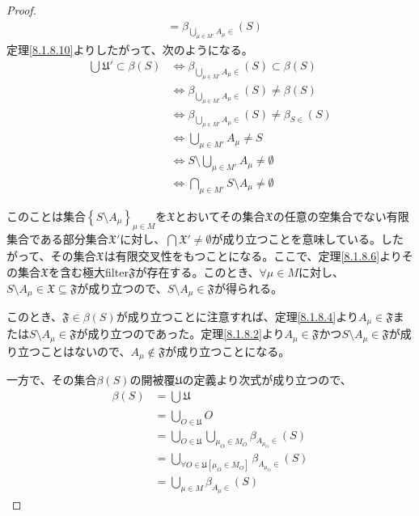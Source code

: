 \documentclass[dvipdfmx]{jsarticle}
\begin{document}
\begin{proof}
\begin{align*}
&= \beta_{\bigcup_{\mu \in M'} A_{\mu} \in}(S)
\end{align*}
定理\ref{8.1.8.10}よりしたがって、次のようになる。
\begin{align*}
\bigcup_{} \mathfrak{U}' \subset \beta(S) &\Leftrightarrow \beta_{\bigcup_{\mu \in M'} A_{\mu} \in}(S) \subset \beta(S)\\
&\Leftrightarrow \beta_{\bigcup_{\mu \in M'} A_{\mu} \in}(S) \neq \beta(S)\\
&\Leftrightarrow \beta_{\bigcup_{\mu \in M'} A_{\mu} \in}(S) \neq \beta_{S \in}(S)\\
&\Leftrightarrow \bigcup_{\mu \in M'} A_{\mu} \neq S\\
&\Leftrightarrow S \setminus \bigcup_{\mu \in M'} A_{\mu} \neq \emptyset\\
&\Leftrightarrow \bigcap_{\mu \in M'} {S \setminus A_{\mu}} \neq \emptyset
\end{align*}\par
このことは集合$\left\{ S \setminus A_{\mu} \right\}_{\mu \in M}$を$\mathfrak{X}$とおいてその集合$\mathfrak{X}$の任意の空集合でない有限集合である部分集合$\mathfrak{X}'$に対し、$\bigcap_{} \mathfrak{X}' \neq \emptyset$が成り立つことを意味している。したがって、その集合$\mathfrak{X}$は有限交叉性をもつことになる。ここで、定理\ref{8.1.8.6}よりその集合$\mathfrak{X}$を含む極大filter$\mathfrak{F}$が存在する。このとき、$\forall\mu \in M$に対し、$S \setminus A_{\mu}\in \mathfrak{X \subseteq F}$が成り立つので、$S \setminus A_{\mu}\in \mathfrak{F}$が得られる。\par
このとき、$\mathfrak{F}\in \beta(S)$が成り立つことに注意すれば、定理\ref{8.1.8.4}より$A_{\mu}\in \mathfrak{F}$または$S \setminus A_{\mu}\in \mathfrak{F}$が成り立つのであった。定理\ref{8.1.8.2}より$A_{\mu}\in \mathfrak{F}$かつ$S \setminus A_{\mu}\in \mathfrak{F}$が成り立つことはないので、$A_{\mu}\notin \mathfrak{F}$が成り立つことになる。\par
一方で、その集合$\beta(S)$の開被覆$\mathfrak{U}$の定義より次式が成り立つので、
\begin{align*}
\beta(S) &= \bigcup_{} \mathfrak{U}\\
&= \bigcup_{O \in \mathfrak{U}} O\\
&= \bigcup_{O \in \mathfrak{U}} {\bigcup_{\mu_{O} \in M_{O}} {\beta_{A_{\mu_{O}} \in}(S)}}\\
&= \bigcup_{\forall O \in \mathfrak{U}\left[ \mu_{O} \in M_{O} \right]} {\beta_{A_{\mu_{O}} \in}(S)}\\
&= \bigcup_{\mu \in M} {\beta_{A_{\mu} \in}(S)}
\end{align*}

\end{proof}
\end{document}

